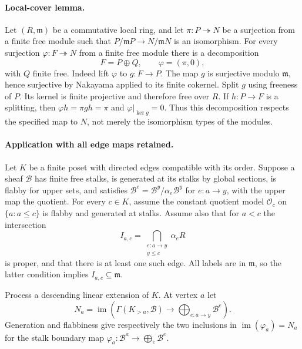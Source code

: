 
\paragraph{Local-cover lemma.}
Let $(R,\mathfrak m)$ be a commutative local ring, and let
$\pi:P\twoheadrightarrow N$ be a surjection from a finite free module
such that $P/\mathfrak mP\to N/\mathfrak mN$ is an isomorphism.
For every surjection $\varphi:F\twoheadrightarrow N$ from a finite free
module there is a decomposition
\[
 F=P\oplus Q,\qquad \varphi=(\pi,0),
\]
with $Q$ finite free.  Indeed lift $\varphi$ to $g:F\to P$.
The map $g$ is surjective modulo $\mathfrak m$, hence surjective by
Nakayama applied to its finite cokernel.  Split $g$ using freeness of $P$.
Its kernel is finite projective and therefore free over $R$.
If $h:P\to F$ is a splitting, then
$\varphi h=\pi gh=\pi$ and $\varphi|_{\ker g}=0$.
Thus this decomposition respects the specified map to $N$, not merely
the isomorphism types of the modules.

\paragraph{Application with all edge maps retained.}
Let $K$ be a finite poset with directed edges compatible with its order.
Suppose a sheaf $\mathcal B$ has finite free stalks, is generated at its
stalks by global sections, is flabby for upper sets, and satisfies
$\mathcal B^e=\mathcal B^y/\alpha_e\mathcal B^y$ for $e:a\to y$,
with the upper map the quotient.
For every $c\in K$, assume the constant quotient model
$\mathcal O_c$ on $\{a:a\leq c\}$ is flabby and generated at stalks.
Assume also that for $a<c$ the intersection
\[
 I_{a,c}=\bigcap_{\substack{e:a\to y\\y\leq c}}\alpha_e R
\]
is proper, and that there is at least one such edge.
All labels are in $\mathfrak m$, so the latter condition implies
$I_{a,c}\subseteq\mathfrak m$.

Process a descending linear extension of $K$.  At vertex $a$ let
\[
 N_a=\operatorname{im}\left(
 \Gamma(K_{>a},\mathcal B)\longrightarrow
 \bigoplus_{e:a\to y}\mathcal B^e\right).
\]
Generation and flabbiness give respectively the two inclusions in
$\operatorname{im}(\varphi_a)=N_a$ for the stalk boundary map
$\varphi_a:\mathcal B^a\to\bigoplus_e\mathcal B^e$.

